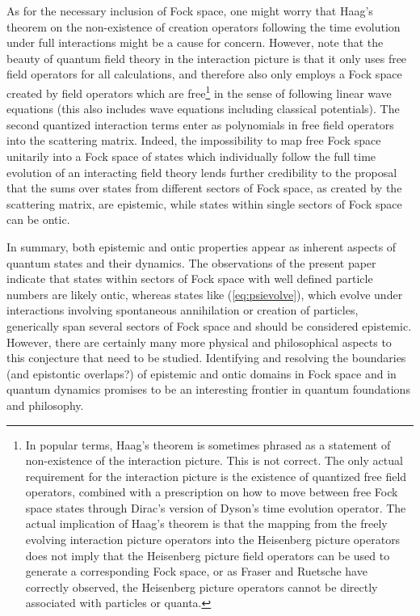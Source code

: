 \documentclass[final,3p,times,twocolumn]{elsarticle3}
\begin{document}
As for the necessary inclusion of Fock space, one might worry that
Haag's theorem \cite{haag1,haag2,fraser,ruetsche} on the non-existence of 
creation operators following the time evolution under full interactions
might be a cause for concern. However, note that the beauty of 
quantum field theory in the interaction picture is that it only 
uses free field operators for all calculations, and therefore also 
only employs a Fock space created by field operators which 
are free\footnote{In popular terms, Haag's theorem is sometimes 
phrased as a statement of non-existence of the interaction picture.
This is not correct. The only actual requirement for the interaction picture
is the existence of quantized free field operators, combined with a prescription
on how to move between free Fock space states through Dirac's version of
Dyson's time evolution operator. The actual implication of Haag's theorem
is that the mapping from the freely evolving interaction picture
operators into the Heisenberg picture operators does not imply that
the Heisenberg picture field operators can be used to generate 
a corresponding Fock space, or as Fraser \cite{fraser} and Ruetsche
\cite{ruetsche} have correctly observed, the Heisenberg picture 
operators cannot be directly associated with particles or quanta.} 
in the sense of following
linear wave equations (this also includes wave equations including
classical potentials). The second quantized interaction terms
enter as polynomials in free field operators into the scattering matrix. 
Indeed, the impossibility to map free Fock space unitarily into
a Fock space of states which individually follow the full time
evolution of an interacting field theory lends further credibility
to the proposal that the sums over states from different sectors of Fock
space, as created by the scattering matrix, are epistemic, while states
within single sectors of Fock space can be ontic.

In summary, both epistemic and ontic properties appear as inherent aspects
of quantum states and their dynamics.
The observations of the present paper indicate that states within sectors of Fock
space with well defined particle numbers are likely ontic, whereas states
like (\ref{eq:psievolve}), which evolve under interactions involving spontaneous
annihilation or creation of particles, generically span several sectors of Fock space 
and should be considered epistemic. 
However, there are certainly many more
physical and philosophical aspects to this conjecture that need to be studied.
Identifying and resolving the boundaries (and epistontic overlaps?) of epistemic 
and ontic domains in Fock space and in quantum dynamics promises to be an 
interesting frontier in quantum foundations and philosophy.
\end{document}
